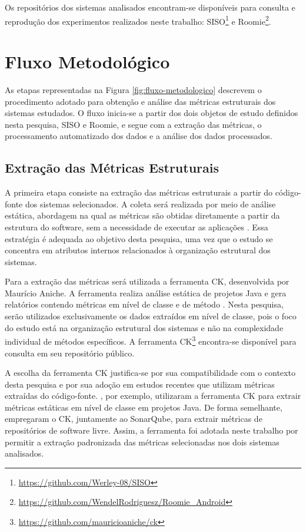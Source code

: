 Os repositórios dos sistemas analisados encontram-se disponíveis para consulta e reprodução dos experimentos realizados 
neste trabalho: SISO\footnote{\url{https://github.com/Werley-08/SISO}} e Roomie\footnote{\url{https://github.com/WendelRodriguesz/Roomie_Android}}.

\section{Fluxo Metodológico}
\label{sec:fluxo-metodologico}

As etapas representadas na Figura \ref{fig:fluxo-metodologico} descrevem o procedimento adotado para obtenção e análise das métricas estruturais 
dos sistemas estudados. O fluxo inicia-se a partir dos dois objetos de estudo definidos nesta pesquisa, SISO e Roomie, e segue com a extração 
das métricas, o processamento automatizado dos dados e a análise dos dados processados.

\subsection{Extração das Métricas Estruturais}
\label{subsec:extracao-metricas}

A primeira etapa consiste na extração das métricas estruturais a partir do código-fonte dos sistemas selecionados. A coleta será realizada 
por meio de análise estática, abordagem na qual as métricas são obtidas diretamente a partir da estrutura do software, sem a necessidade 
de executar as aplicações \cite{sommerville2011}. Essa estratégia é adequada ao objetivo desta pesquisa, uma vez que o estudo se concentra 
em atributos internos relacionados à organização estrutural dos sistemas.

Para a extração das métricas será utilizada a ferramenta CK, desenvolvida por Maurício Aniche. A ferramenta realiza análise estática de 
projetos Java e gera relatórios contendo métricas em nível de classe e de método \cite{aniche-ck}. Nesta pesquisa, serão utilizados 
exclusivamente os dados extraídos em nível de classe, pois o foco do estudo está na organização estrutural dos sistemas e não na 
complexidade individual de métodos específicos. A ferramenta CK\footnote{\url{https://github.com/mauricioaniche/ck}} encontra-se
disponível para consulta em seu repositório público.

A escolha da ferramenta CK justifica-se por sua compatibilidade com o contexto desta pesquisa e por sua adoção em estudos 
recentes que utilizam métricas extraídas do código-fonte. , por exemplo, utilizaram a ferramenta CK para 
extrair métricas estáticas em nível de classe em projetos Java. De forma semelhante,  empregaram o CK, juntamente 
ao SonarQube, para extrair métricas de repositórios de software livre. Assim, a ferramenta foi adotada neste trabalho por permitir 
a extração padronizada das métricas selecionadas nos dois sistemas analisados.

